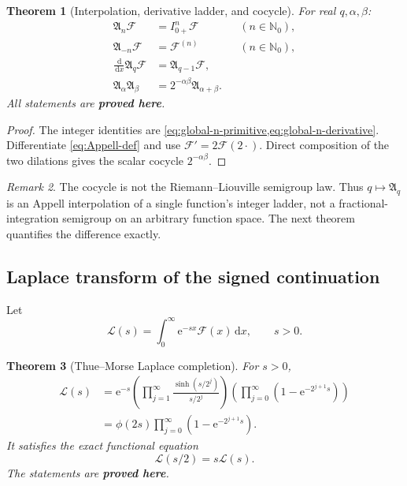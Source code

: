 \documentclass[11pt]{article}
\newcommand{\statusproved}{\textcolor{statusgreen}{\textbf{proved here}}}
\newtheorem{theorem}{Theorem}[section]
\theoremstyle{definition}
\theoremstyle{remark}
\newtheorem{remark}[theorem]{Remark}
\newcommand{\N}{\mathbb N}
\newcommand{\dd}{\,\mathrm d}
\newcommand{\e}{\mathrm e}
\newcommand{\extF}{\mathcal F}
\newcommand{\Aop}{\mathfrak A}
\begin{document}
\begin{theorem}[Interpolation, derivative ladder, and cocycle]
\label{thm:Appell-structure}
For real $q,\alpha,\beta$:
\begin{align}
 \Aop_n\extF&=I_{0+}^{n}\extF &&(n\in\N_0),
 \label{eq:Appell-positive-integers}\\
 \Aop_{-n}\extF&=\extF^{(n)} &&(n\in\N_0),
 \label{eq:Appell-negative-integers}\\
 \frac{\dd}{\dd x}\Aop_q\extF&=\Aop_{q-1}\extF,
 \label{eq:Appell-derivative}\\
 \Aop_\alpha\Aop_\beta&=2^{-\alpha\beta}\Aop_{\alpha+\beta}.
 \label{eq:Appell-cocycle}
\end{align}
All statements are \statusproved.
\end{theorem}

\begin{proof}
The integer identities are \cref{eq:global-n-primitive,eq:global-n-derivative}.  Differentiate
\cref{eq:Appell-def} and use $\extF'=2\extF(2\cdot)$.  Direct composition of the two dilations
gives the scalar cocycle $2^{-\alpha\beta}$.
\end{proof}

\begin{remark}
The cocycle is not the Riemann--Liouville semigroup law.  Thus $q\mapsto\Aop_q$ is an Appell
interpolation of a single function's integer ladder, not a fractional-integration semigroup on
an arbitrary function space.  The next theorem quantifies the difference exactly.
\end{remark}

\subsection{Laplace transform of the signed continuation}

Let
\begin{equation}
 \mathscr L(s)=\int_0^{\infty}\e^{-sx}\extF(x)\dd x,
 \qquad s>0.
 \label{eq:signed-Laplace-def}
\end{equation}

\begin{theorem}[Thue--Morse Laplace completion]
\label{thm:signed-Laplace-product}
For $s>0$,
\begin{align}
 \mathscr L(s)
 &=\e^{-s}\left(\prod_{j=1}^{\infty}\frac{\sinh(s/2^j)}{s/2^j}\right)
   \left(\prod_{j=0}^{\infty}(1-\e^{-2^{j+1}s})\right)
 \label{eq:signed-Laplace-up}\\
 &=\phi(2s)\prod_{j=0}^{\infty}(1-\e^{-2^{j+1}s}).
 \label{eq:signed-Laplace-phi}
\end{align}
It satisfies the exact functional equation
\begin{equation}
 \mathscr L(s/2)=s\mathscr L(s).
 \label{eq:signed-Laplace-functional}
\end{equation}
The statements are \statusproved.
\end{theorem}
\end{document}
